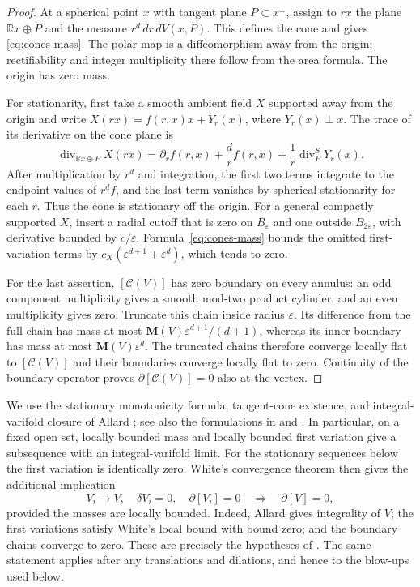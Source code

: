 \begin{proof}
At a spherical point $x$ with tangent plane $P\subset x^\perp$, assign
to $rx$ the plane $\mathbb Rx\oplus P$ and the measure
$r^d\,dr\,dV(x,P)$.  This defines the cone and gives
\eqref{eq:cones-mass}.  The polar map is a diffeomorphism away from
the origin; rectifiability and integer multiplicity there follow
from the area formula.  The origin has zero mass.

For stationarity, first take a smooth ambient field $X$ supported
away from the origin and write
$X(rx)=f(r,x)x+Y_r(x)$, where $Y_r(x)\perp x$.
The trace of its derivative on the cone plane is
\[
 \operatorname{div}_{\mathbb Rx\oplus P}X(rx)
 =\partial_r f(r,x)+\frac{d}{r}f(r,x)
       +\frac1r\operatorname{div}^{S}_{P}Y_r(x).
\]
After multiplication by $r^d$ and integration, the first two terms
integrate to the endpoint values of $r^df$, and the last term
vanishes by spherical stationarity for each $r$.  Thus the cone is
stationary off the origin.  For a general compactly supported $X$,
insert a radial cutoff that is zero on $B_\varepsilon$ and one
outside $B_{2\varepsilon}$, with derivative bounded by
$c/\varepsilon$.  Formula~\eqref{eq:cones-mass} bounds the omitted
first-variation terms by
$c_X(\varepsilon^{d+1}+\varepsilon^d)$, which tends to zero.

For the last assertion, $[\mathcal C(V)]$ has zero boundary on
every annulus: an odd component multiplicity gives a smooth
mod-two product cylinder, and an even multiplicity gives zero.
Truncate this chain inside radius $\varepsilon$.  Its difference
from the full chain has mass at most
$\mathbf M(V)\varepsilon^{d+1}/(d+1)$, whereas its inner boundary
has mass at most $\mathbf M(V)\varepsilon^d$.
The truncated chains therefore converge locally flat to
$[\mathcal C(V)]$ and their boundaries converge locally flat to zero.
Continuity of the boundary operator proves
$\partial[\mathcal C(V)]=0$ also at the vertex.
\end{proof}

We use the stationary monotonicity formula, tangent-cone existence,
and integral-varifold closure of Allard
\cite[\S5 and Theorem~6.4]{Allard1972}; see also the formulations in
\cite[Chapter~4, \S3]{SimonGMT} and
\cite[Theorem~3.2]{White2009}.
In particular, on a fixed open set, locally bounded mass and locally
bounded first variation give a subsequence with an integral-varifold
limit.  For the stationary sequences below the first variation is
identically zero.  White's convergence theorem then gives the
additional implication
\begin{equation}\label{eq:cones-white}
 V_i\longrightarrow V,\quad \delta V_i=0,\quad
 \partial[V_i]=0
 \quad\Longrightarrow\quad \partial[V]=0,
\end{equation}
provided the masses are locally bounded.  Indeed, Allard gives
integrality of $V$; the first variations satisfy White's local bound
with bound zero; and the boundary chains converge to zero.
These are precisely the hypotheses of
\cite[Definition~3.1 and Theorem~3.3]{White2009}.
The same statement applies after any translations and dilations,
and hence to the blow-ups used below.

